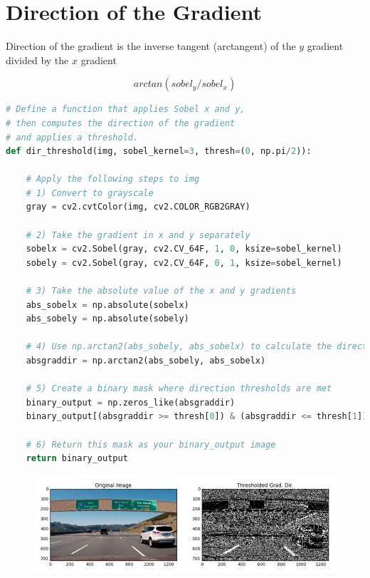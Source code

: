 \documentclass[12pt]{article}
\begin{document}
\section{Direction of the Gradient}

Direction of the gradient is the inverse tangent (arctangent) of the $y$ gradient divided by the $x$ gradient

$$arctan(sobel_y/sobel_x)$$

\begin{lstlisting}[language=Python]
# Define a function that applies Sobel x and y, 
# then computes the direction of the gradient
# and applies a threshold.
def dir_threshold(img, sobel_kernel=3, thresh=(0, np.pi/2)):
    
    # Apply the following steps to img
    # 1) Convert to grayscale
    gray = cv2.cvtColor(img, cv2.COLOR_RGB2GRAY)
    
    # 2) Take the gradient in x and y separately
    sobelx = cv2.Sobel(gray, cv2.CV_64F, 1, 0, ksize=sobel_kernel)
    sobely = cv2.Sobel(gray, cv2.CV_64F, 0, 1, ksize=sobel_kernel)
    
    # 3) Take the absolute value of the x and y gradients
    abs_sobelx = np.absolute(sobelx)
    abs_sobely = np.absolute(sobely)
    
    # 4) Use np.arctan2(abs_sobely, abs_sobelx) to calculate the direction of the gradient 
    absgraddir = np.arctan2(abs_sobely, abs_sobelx)
    
    # 5) Create a binary mask where direction thresholds are met
    binary_output = np.zeros_like(absgraddir)
    binary_output[(absgraddir >= thresh[0]) & (absgraddir <= thresh[1])] = 1
    
    # 6) Return this mask as your binary_output image
    return binary_output
\end{lstlisting}

\begin{figure}[htp]
    \centering
    \includegraphics[width=15cm]{direction_of_gradient.png}
    \label{fig:direction_of_gradient}
\end{figure}
\end{document}
